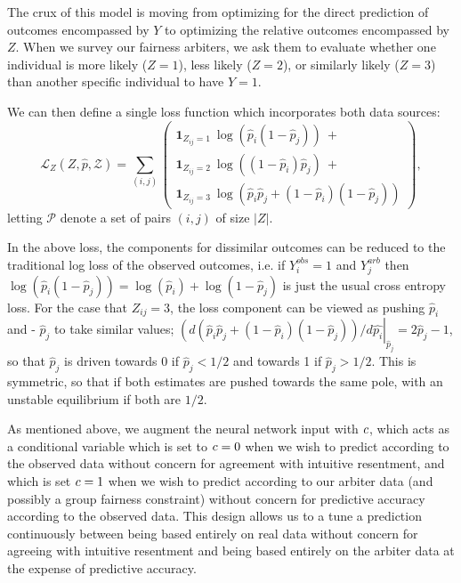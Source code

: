     The crux of this model is moving from optimizing for the direct prediction of outcomes encompassed by $Y$ to optimizing the relative outcomes encompassed by $Z$.  When we survey our fairness arbiters, we ask them to evaluate whether one individual is more likely ($Z = 1$), less likely ($Z = 2$), or similarly likely ($Z = 3$) than another specific individual to have $Y = 1$.
    
    We can then define a single loss function which incorporates both data sources:
    $$ \mathcal{L}_Z(Z, \hat{p}, \mathcal{Z}) = \sum\limits_{(i, j)} \left(\begin{array}{l} 
        \mathbf{1}_{Z_{ij} = 1} ~ \log\left( \hat{p}_i (1 - \hat{p}_j)  \right) ~ + \\
        \mathbf{1}_{Z_{ij} = 2} ~ \log\left( (1 - \hat{p}_i) \hat{p}_j  \right) ~ + \\
        \mathbf{1}_{Z_{ij} = 3} ~ \log\left(\hat{p}_i \hat{p}_j + (1 - \hat{p}_i)(1 - \hat{p}_j) \right)
        \end{array}\right), \label{eq:sm_pairwise_loss}$$
    letting $\mathcal{P}$ denote a set of pairs $(i, j)$ of size $|Z|$.
    
    In the above loss, the components for dissimilar outcomes can be reduced to the traditional log loss of the observed outcomes, i.e. if $Y_i^{obs} = 1$ and $Y_j^{arb}$ then 
        $ \log\left( \hat{p}_i (1 - \hat{p}_j)  \right) = \log\left( \hat{p}_i \right) + \log\left(1 - \hat{p}_j  \right)$ 
    is just the usual cross entropy loss.  For the case that $Z_{ij} = 3$, the loss component can be viewed as pushing $\hat{p}_i$ and  - $\hat{p}_j$ to take similar values; $\left(d \left(\hat{p}_i \hat{p}_j + (1 - \hat{p}_i)(1 - \hat{p}_j) \right)/d\hat{p_i}\right|_{\hat{p}_j} = 2\hat{p}_j - 1$, so that $\hat{p}_j$ is driven towards 0 if $\hat{p}_j < 1/2$ and towards 1 if $\hat{p}_j > 1/2$.  This is symmetric, so that if both estimates are pushed towards the same pole, with an unstable equilibrium if both are $1/2$.

    As mentioned above, we augment the neural network input with $c$, which acts as a conditional variable which is set to $c = 0$ when we wish to predict according to the observed data without concern for agreement with intuitive resentment, and which is set $c = 1$ when we wish to predict according to our arbiter data (and possibly a group fairness constraint) without concern for predictive accuracy according to the observed data.  This design allows us to a tune a prediction continuously between being based entirely on real data without concern for agreeing with intuitive resentment and being based entirely on the arbiter data at the expense of predictive accuracy.
    

